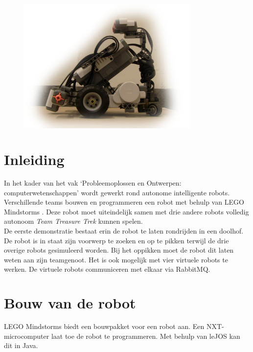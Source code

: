 \documentclass[t1]{penoverslag}
\begin{document}
\begin{figure}[!hb]
\begin{flushright}
    \includegraphics[width=0.8\textwidth]{robotFP}
    \label{fig:robotFP}
\end{flushright}
\end{figure}

\newpage
\setcounter{tocdepth}{2}
\tableofcontents

\newpage
\listoftables
\listoffigures

\thispagestyle{empty}

\newpage 

\section{Inleiding} %
\label{ssec:inl}
In het kader van het vak `Probleemoplossen en Ontwerpen: computerwetenschappen' wordt gewerkt rond autonome intelligente robots. Verschillende teams bouwen en programmeren een robot met behulp van LEGO Mindstorms \cite{mindstorms}. Deze robot moet uiteindelijk samen met drie andere robots volledig autonoom \textit{Team Treasure Trek} kunnen spelen.\\

De eerste demonstratie bestaat erin de robot te laten rondrijden in een doolhof. De robot is in staat zijn voorwerp te zoeken en op te pikken terwijl de drie overige robots gesimuleerd worden. Bij het oppikken moet de robot dit laten weten aan zijn teamgenoot. Het is ook mogelijk met vier virtuele robots te werken. De virtuele robots communiceren met elkaar via RabbitMQ.\\

\section{Bouw van de robot} %
\label{sec:bouw}
LEGO Mindstorms \cite{mindstorms} biedt een bouwpakket voor een robot aan. Een NXT-microcomputer laat toe de robot te programmeren. Met behulp van leJOS \cite{leJOS} kan dit in Java.
\end{document}
